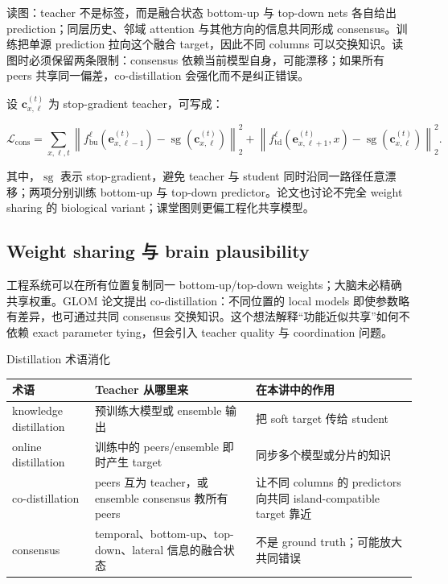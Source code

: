 
\begin{knowledgebox}{读图：teacher 不是标签，而是融合状态}
bottom-up 与 top-down nets 各自给出 prediction；同层历史、邻域 attention 与其他方向的信息共同形成 consensus。训练把单源 prediction 拉向这个融合 target，因此不同 columns 可以交换知识。读图时必须保留两条限制：consensus 依赖当前模型自身，可能漂移；如果所有 peers 共享同一偏差，co-distillation 会强化而不是纠正错误。
\end{knowledgebox}

设 $\mathbf c_{x,\ell}^{(t)}$ 为 stop-gradient teacher，可写成：

\[
\mathcal L_{\mathrm{cons}}=
\sum_{x,\ell,t}
\left\|
f_{\mathrm{bu}}^{\ell}\!\left(\mathbf e_{x,\ell-1}^{(t)}\right)
-\operatorname{sg}\!\left(\mathbf c_{x,\ell}^{(t)}\right)
\right\|_2^2
+
\left\|
f_{\mathrm{td}}^{\ell}\!\left(\mathbf e_{x,\ell+1}^{(t)},x\right)
-\operatorname{sg}\!\left(\mathbf c_{x,\ell}^{(t)}\right)
\right\|_2^2.
\]

其中，$\operatorname{sg}$ 表示 stop-gradient，避免 teacher 与 student 同时沿同一路径任意漂移；两项分别训练 bottom-up 与 top-down predictor。论文也讨论不完全 weight sharing 的 biological variant；课堂图则更偏工程化共享模型。

\subsection{Weight sharing 与 brain plausibility}

工程系统可以在所有位置复制同一 bottom-up/top-down weights；大脑未必精确共享权重。GLOM 论文提出 co-distillation：不同位置的 local models 即使参数略有差异，也可通过共同 consensus 交换知识。这个想法解释“功能近似共享”如何不依赖 exact parameter tying，但会引入 teacher quality 与 coordination 问题。


\begin{knowledgebox}{Distillation 术语消化}
\begin{tabularx}{\textwidth}{L{0.22\textwidth}L{0.30\textwidth}X}
\toprule
术语 & Teacher 从哪里来 & 在本讲中的作用 \\
\midrule
knowledge distillation & 预训练大模型或 ensemble 输出 & 把 soft target 传给 student \\
online distillation & 训练中的 peers/ensemble 即时产生 target & 同步多个模型或分片的知识 \\
co-distillation & peers 互为 teacher，或 ensemble consensus 教所有 peers & 让不同 columns 的 predictors 向共同 island-compatible target 靠近 \\
consensus & temporal、bottom-up、top-down、lateral 信息的融合状态 & 不是 ground truth；可能放大共同错误 \\
\bottomrule
\end{tabularx}
\end{knowledgebox}

